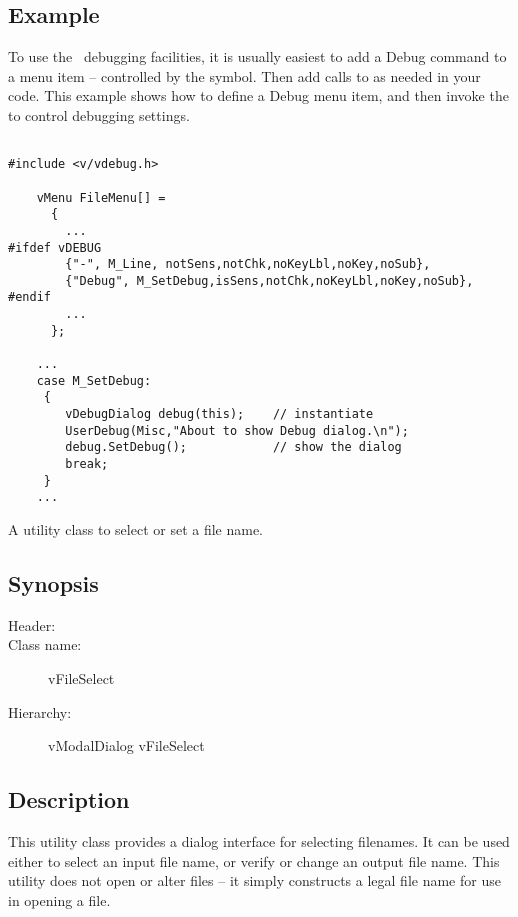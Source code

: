 \subsection* {Example}

To use the \V\ debugging facilities, it is usually easiest to
add a Debug command to a menu item -- controlled by the 
symbol.  Then add calls to  as needed in your code.
This example shows how to define a Debug menu item, and then invoke
the  to control debugging settings.

\footnotesize
\begin{verbatim}

#include <v/vdebug.h>

    vMenu FileMenu[] =
      {
        ...
#ifdef vDEBUG
        {"-", M_Line, notSens,notChk,noKeyLbl,noKey,noSub},
        {"Debug", M_SetDebug,isSens,notChk,noKeyLbl,noKey,noSub},
#endif
        ...
      };

    ...
    case M_SetDebug:
     {
        vDebugDialog debug(this);    // instantiate
        UserDebug(Misc,"About to show Debug dialog.\n");
        debug.SetDebug();            // show the dialog
        break;
     }
    ...

\end{verbatim}
\normalfont\normalsize



A utility class to select or set a file name.

\subsection* {Synopsis}

\begin{description}
        \item [Header:] 
        \item [Class name:] vFileSelect
        \item [Hierarchy:] vModalDialog \rta vFileSelect
\end{description}

\subsection* {Description}

This utility class provides a dialog interface for selecting
filenames. It can be used either to select an input file name,
or verify or change an output file name. This utility does not
open or alter files -- it simply constructs a legal file name for
use in opening a file.

